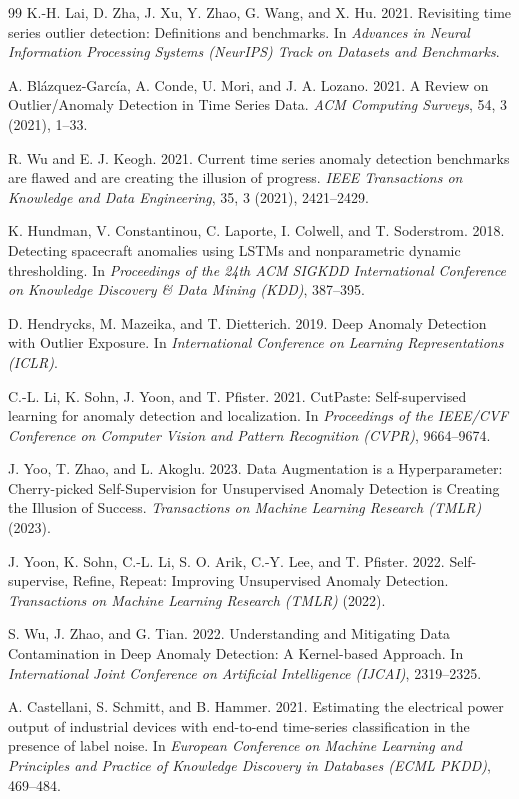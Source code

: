 \documentclass[sigconf,nonacm]{acmart}
\begin{document}
\begin{thebibliography}{99}
K.-H. Lai, D. Zha, J. Xu, Y. Zhao, G. Wang, and X. Hu. 2021.
Revisiting time series outlier detection: Definitions and benchmarks.
In \textit{Advances in Neural Information Processing Systems (NeurIPS) Track on Datasets and Benchmarks}.

A. Blázquez-García, A. Conde, U. Mori, and J. A. Lozano. 2021.
A Review on Outlier/Anomaly Detection in Time Series Data.
\textit{ACM Computing Surveys}, 54, 3 (2021), 1--33.

R. Wu and E. J. Keogh. 2021.
Current time series anomaly detection benchmarks are flawed and are creating the illusion of progress.
\textit{IEEE Transactions on Knowledge and Data Engineering}, 35, 3 (2021), 2421--2429.

K. Hundman, V. Constantinou, C. Laporte, I. Colwell, and T. Soderstrom. 2018.
Detecting spacecraft anomalies using LSTMs and nonparametric dynamic thresholding.
In \textit{Proceedings of the 24th ACM SIGKDD International Conference on Knowledge Discovery \& Data Mining (KDD)}, 387--395.

D. Hendrycks, M. Mazeika, and T. Dietterich. 2019.
Deep Anomaly Detection with Outlier Exposure.
In \textit{International Conference on Learning Representations (ICLR)}.

C.-L. Li, K. Sohn, J. Yoon, and T. Pfister. 2021.
CutPaste: Self-supervised learning for anomaly detection and localization.
In \textit{Proceedings of the IEEE/CVF Conference on Computer Vision and Pattern Recognition (CVPR)}, 9664--9674.

J. Yoo, T. Zhao, and L. Akoglu. 2023.
Data Augmentation is a Hyperparameter: Cherry-picked Self-Supervision for Unsupervised Anomaly Detection is Creating the Illusion of Success.
\textit{Transactions on Machine Learning Research (TMLR)} (2023).

J. Yoon, K. Sohn, C.-L. Li, S. O. Arik, C.-Y. Lee, and T. Pfister. 2022.
Self-supervise, Refine, Repeat: Improving Unsupervised Anomaly Detection.
\textit{Transactions on Machine Learning Research (TMLR)} (2022).

S. Wu, J. Zhao, and G. Tian. 2022.
Understanding and Mitigating Data Contamination in Deep Anomaly Detection: A Kernel-based Approach.
In \textit{International Joint Conference on Artificial Intelligence (IJCAI)}, 2319--2325.

A. Castellani, S. Schmitt, and B. Hammer. 2021.
Estimating the electrical power output of industrial devices with end-to-end time-series classification in the presence of label noise.
In \textit{European Conference on Machine Learning and Principles and Practice of Knowledge Discovery in Databases (ECML PKDD)}, 469--484.


\end{thebibliography}
\end{document}
